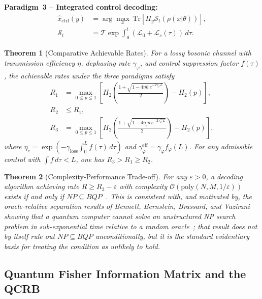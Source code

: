 \documentclass[journal,twocolumn]{IEEEtran}
\theoremstyle{definition}
\theoremstyle{plain}
\newtheorem{theorem}{Theorem}[section]
\newcommand{\Tr}{\mathrm{Tr}}
\begin{document}
\medskip\noindent\textbf{Paradigm~3 -- Integrated control decoding:}
\begin{align}
  \hat x_{\mathrm{ctrl}}(y) &= \arg\max_x\,
    \Tr[\Pi_y \mathcal{S}_t(\rho(x|\theta))], \nonumber\\
  \mathcal{S}_t &= \mathcal{T}\!\exp\!\int_0^t
    (\mathcal{L}_0 + \mathcal{L}_c(\tau))\,d\tau.
  \label{eq:paradigm3}
\end{align}

\begin{theorem}[Comparative Achievable Rates]
\label{thm:comparative}
For a lossy bosonic channel with transmission efficiency $\eta$,
dephasing rate $\gamma_\varphi$, and control suppression factor
$f(\tau)$, the achievable rates under the three paradigms satisfy
\begin{align}
  R_1 &= \max_{0 \le p \le 1}\!\left[
    H_2\!\left(\frac{1+\sqrt{1 - 4\eta\bar n\,
      e^{-2\gamma_\varphi L}}}{2}\right) - H_2(p)\right],
    \nonumber\\
  R_2 &\le R_1, \nonumber\\
  R_3 &= \max_{0\le p\le1}\!\left[
    H_2\!\left(\frac{1+\sqrt{1 - 4\eta_c\bar n\,
      e^{-2\gamma_\varphi^{\mathrm{eff}}L}}}{2}\right)
    - H_2(p)\right],
  \label{eq:rates}
\end{align}
where $\eta_c = \exp(-\gamma_{\mathrm{loss}}\int_0^L f(\tau)\,d\tau)$
and $\gamma_\varphi^{\mathrm{eff}} = \gamma_\varphi f_\varphi(L)$.
For any admissible control with $\int f\, d\tau < L$, one has
$R_3 > R_1 \ge R_2$.
\end{theorem}

\begin{theorem}[Complexity-Performance Trade-off]
\label{thm:complexity}
For any $\varepsilon > 0$, a decoding algorithm achieving rate
$R \ge R_3 - \varepsilon$ with complexity
$\mathcal{O}(\mathrm{poly}(N, M, 1/\varepsilon))$ exists if and
only if $NP \subseteq BQP$~\cite{aaronson2005}. This is consistent
with, and motivated by, the oracle-relative separation results of
Bennett, Bernstein, Brassard, and Vazirani showing that a quantum
computer cannot solve an unstructured NP search problem in
sub-exponential time relative to a random oracle~\cite{bennett1997};
that result does not by itself rule out $NP\subseteq BQP$
unconditionally, but it is the standard evidentiary basis for
treating the condition as unlikely to hold.
\end{theorem}

\subsection{Quantum Fisher Information Matrix and the QCRB}
\end{document}
